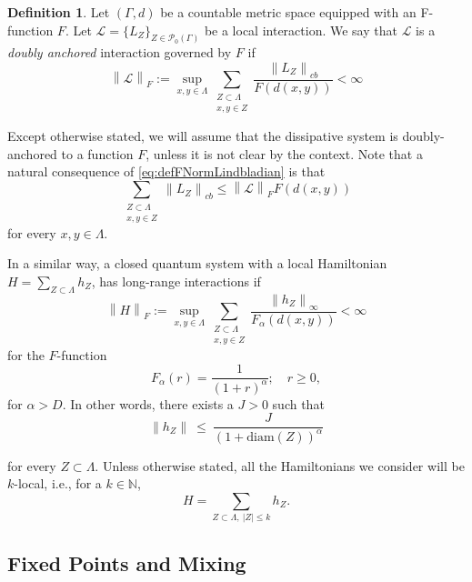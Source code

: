 \documentclass[11pt]{article}
\numberwithin{equation}{section}
\numberwithin{figure}{section}
\numberwithin{table}{section}
\theoremstyle{definition}
\newtheorem{mydef}{Definition}[section]
\theoremstyle{plain}
\theoremstyle{remark}
\newcommand{\Li}{\mathcal{L}}
\newcommand{\La}{\Lambda}
\newcommand{\norm}[1]{\left\lVert#1\right\rVert}
\newcommand{\normm}[2]{\left\lVert#1\right\rVert_{#2}}
\begin{document}
\begin{mydef}
    Let $(\Gamma,d)$ be a countable metric space equipped with an F-function $F$. Let $\Li=\{L_Z\}_{Z\in \mathcal{P}_0(\Gamma)}$ be a local interaction. We say that $\Li$ is a \emph{doubly anchored} interaction governed by $F$ if
    \begin{equation}\label{eq:defFNormLindbladian}
        \normm{\Li}{F}:=\sup_{x,y\in \La}\sum\limits_{\substack{Z\subset \La \\x,y\in Z}}\dfrac{\normm{L_Z}{cb}}{F(d(x,y))}<\infty
    \end{equation}
\end{mydef}

Except otherwise stated, we will assume that the dissipative system is doubly-anchored to a function $F$, unless it is not clear by the context. Note that a natural consequence of \eqref{eq:defFNormLindbladian} is that
    \begin{equation}\label{eq:FNormLindbladian}
    \sum\limits_{\substack{Z\subset \La \\x,y\in Z}}\normm{L_Z}{cb}\leq \normm{\Li}{F} F(d(x,y)) 
\end{equation}
for every $x,y \in \Lambda$.

In a similar way, a closed quantum system with a local Hamiltonian $H=\sum_{Z\subset\Lambda} h_Z$, has long-range interactions if
\begin{equation}\label{eq:defFNormHamiltonian}
    \normm{H}{F}:= \sup_{x,y\in \La}\sum\limits_{\substack{Z\subset \La \\x,y\in Z}}\dfrac{\normm{h_Z}{\infty}}{F_\alpha(d(x,y))}<\infty
\end{equation}
for the $F$-function\[F_\alpha(r)=\dfrac{1}{(1+r)^\alpha};\quad r\geq 0,\]
for $\alpha>D$. In other words, there exists a $J>0$ such that
\begin{equation}\label{eq:powerlaw}
\norm{h_Z}\ \le\ \frac{J}{(1+\mathrm{diam}(Z))^{\alpha}} 
\end{equation}

for every $Z \subset \Lambda$. Unless otherwise stated, all the Hamiltonians we consider will be $k$-local, i.e., for a $k\in\mathbb{N}$,
\begin{equation}\label{eq:Hklocal}
H=\sum_{Z\subset\Lambda,\ |Z|\le k} h_Z.
\end{equation}



\subsection{Fixed Points and Mixing}
\end{document}
